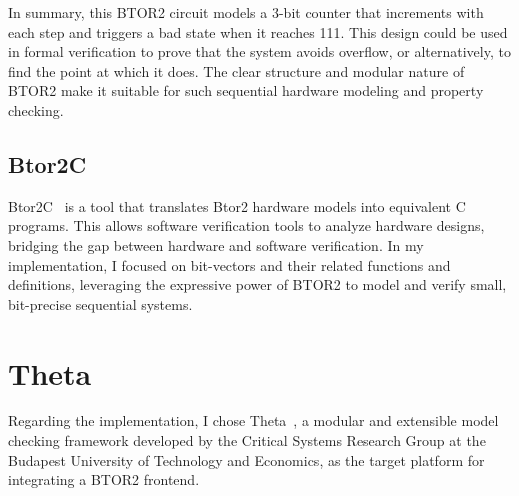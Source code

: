 
In summary, this BTOR2 circuit models a 3-bit counter that increments with each step and triggers a bad state when it reaches 111. This design could be used in formal verification to prove that the system avoids overflow, or alternatively, to find the point at which it does. The clear structure and modular nature of BTOR2 make it suitable for such sequential hardware modeling and property checking.

\subsection{Btor2C}


Btor2C~\cite{btor2c} is a tool that translates Btor2 hardware models into equivalent C programs. This allows software verification tools to analyze hardware designs, bridging the gap between hardware and software verification.
 In my implementation, I focused on bit-vectors and their related functions and definitions, leveraging the expressive power of BTOR2 to model and verify small, bit-precise sequential systems.


\section{Theta}

Regarding the implementation, I chose Theta~\cite{theta}, a modular and extensible model checking framework developed by the Critical Systems Research Group at the Budapest University of Technology and Economics, as the target platform for integrating a BTOR2 frontend.

